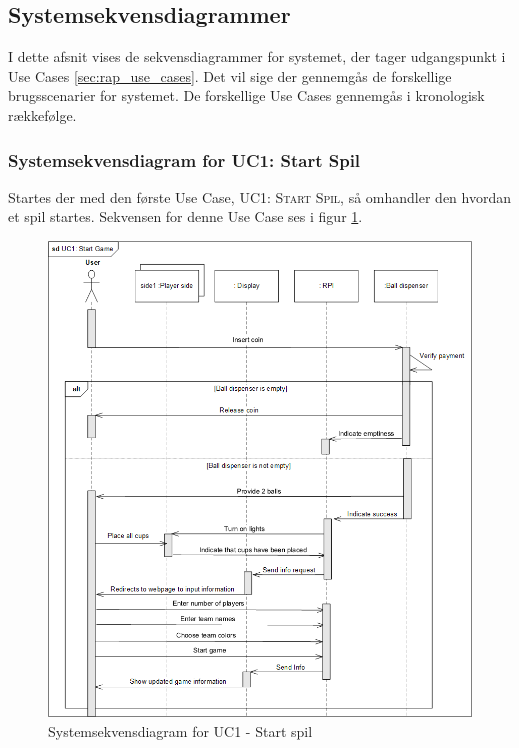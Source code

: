 \documentclass[Rapport/Rapport_main.tex]{subfiles}
\begin{document}
\subsection{Systemsekvensdiagrammer}
I dette afsnit vises de sekvensdiagrammer for systemet, der tager udgangspunkt i Use Cases \ref{sec:rap_use_cases}. Det vil sige der gennemgås de forskellige brugsscenarier for systemet. De forskellige Use Cases gennemgås i kronologisk rækkefølge.

\subsubsection{Systemsekvensdiagram for UC1: Start Spil}
Startes der med den første Use Case, \textsc{UC1: Start Spil}, så omhandler den hvordan et spil startes. Sekvensen for denne Use Case ses i figur \ref{fig:rap_sd_UC1}.
\begin{figure}[H]
    \centering
    \includegraphics[width=\textwidth]{Arkitektur/Sekvensdiagrammer/graphics/sd_UC1.png}
    \caption{Systemsekvensdiagram for UC1 - Start spil}
    \label{fig:rap_sd_UC1}
\end{figure}
\end{document}
